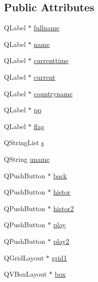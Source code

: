 \subsection*{Public Attributes}
\begin{DoxyCompactItemize}
\item 
Q\+Label $\ast$ \hyperlink{classprofile_ad09122f8c52c906428277964d0ff6d6a}{fullname}
\item 
Q\+Label $\ast$ \hyperlink{classprofile_aa4c9275bf2e98a297e390990023acffa}{name}
\item 
Q\+Label $\ast$ \hyperlink{classprofile_af5988e8dfd27a05eb93292a508e737de}{currenttime}
\item 
Q\+Label $\ast$ \hyperlink{classprofile_ae89d85b7a03006454b09e702766d7428}{current}
\item 
Q\+Label $\ast$ \hyperlink{classprofile_af8ccb40023c00508256a01c54a1b1714}{countryname}
\item 
Q\+Label $\ast$ \hyperlink{classprofile_a92d0c4e4d12fbef61bf63384ad047744}{pp}
\item 
Q\+Label $\ast$ \hyperlink{classprofile_a115f987a1ad7836471de342faeb5177f}{flag}
\item 
Q\+String\+List \hyperlink{classprofile_a9ce924e0fad9e3dd191c4020a1db0230}{s}
\item 
Q\+String \hyperlink{classprofile_a321f742e7986c4ab494ac5c30206c1f1}{uname}
\item 
Q\+Push\+Button $\ast$ \hyperlink{classprofile_a3578ca08b26ba4390891fbbac1e93013}{back}
\item 
Q\+Push\+Button $\ast$ \hyperlink{classprofile_a6ba0dc6cc5e724759f97f4223c1e1b5d}{histor}
\item 
Q\+Push\+Button $\ast$ \hyperlink{classprofile_a0dbcc8440fbd05400bf0ea770aae045f}{histor2}
\item 
Q\+Push\+Button $\ast$ \hyperlink{classprofile_a77ad898c8cc12bc50a9ef0815bc696e1}{play}
\item 
Q\+Push\+Button $\ast$ \hyperlink{classprofile_adbad489bbd85e8a12240a891302d99ac}{play2}
\item 
Q\+Grid\+Layout $\ast$ \hyperlink{classprofile_ac5540bb2c77a760b73954011bc154df7}{grid1}
\item 
Q\+V\+Box\+Layout $\ast$ \hyperlink{classprofile_a70306eff274acb49387465476004582b}{box}
\end{DoxyCompactItemize}

